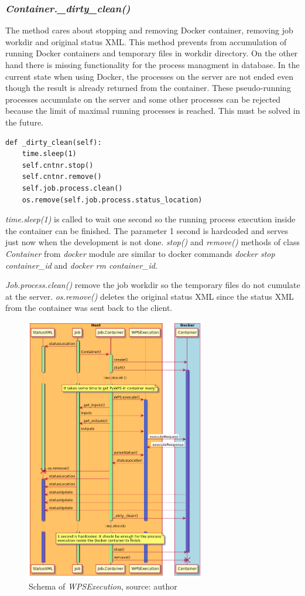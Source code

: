 \subsubsection{\textit{Container.\_dirty\_clean()}}
The method cares about stopping and removing Docker container, removing job workdir and original status XML. This method prevents from
accumulation of running Docker containers and temporary files in workdir directory. On the other hand there is missing functionality
for the process managment in database. In the current state when using Docker, the processes on the server are not ended even though
the result is already returned from the container. These pseudo-running processes accumulate on the server and some other processes
can be rejected because the limit of maximal running  processes is reached. This must be solved in the future.

\begin{lstlisting}[basicstyle=\small,caption={\textit{get\_inputs} return value},label={lst:Container.get_inputs}]
def _dirty_clean(self):
    time.sleep(1)
    self.cntnr.stop()
    self.cntnr.remove()
    self.job.process.clean()
    os.remove(self.job.process.status_location)
\end{lstlisting}

\textit{time.sleep(1)} is called to wait one second so the running process execution inside the container can be finished. The parameter
1 second is hardcoded and serves just now when the development is not done. \textit{stop()} and \textit{remove()} methods of class 
\textit{Container} from \textit{docker} module are similar to docker commands \textit{docker stop container\_id} and 
\textit{docker rm container\_id}.

\textit{Job.process.clean()} remove the job workdir so the temporary files do not cumulate at the server. \textit{os.remove()} deletes
the original status XML since the status XML from the container was sent back to the client.

\begin{figure}[h!]
\centering
\includegraphics[width=0.7\textwidth]{img/Diag_WPSExecute.png}
\caption{Schema of \textit{WPSExecution}, source: author}
\label{fig:DiagWPSExecute}
\end{figure}

